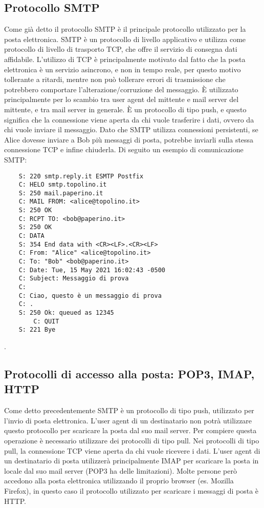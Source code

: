 \subsection{Protocollo SMTP}
Come già detto il protocollo SMTP è il principale protocollo utilizzato per la posta elettronica.
SMTP è un protocollo di livello applicativo e utilizza come protocollo di livello di trasporto TCP,
che offre il servizio di consegna dati affidabile. 
L'utilizzo di TCP è principalmente motivato dal fatto che la posta elettronica è un servizio asincrono, 
e non in tempo reale, per questo motivo tollerante a ritardi, mentre non può tollerare errori di trasmissione 
che potrebbero comportare l'alterazione/corruzione del messaggio. 
È utilizzato principalmente per lo scambio tra user agent del mittente e mail server del mittente, e tra mail server 
in generale. È un protocollo di tipo push, e questo significa che la connessione viene aperta da chi vuole 
trasferire i dati, ovvero da chi vuole inviare il messaggio. Dato che SMTP utilizza connessioni persistenti, 
se Alice dovesse inviare a Bob più messaggi di posta, potrebbe inviarli sulla stessa connessione TCP e 
infine chiuderla.
Di seguito un esempio di comunicazione SMTP:
\pagebreak
\begin{verbatim}
    S: 220 smtp.reply.it ESMTP Postfix
    C: HELO smtp.topolino.it
    S: 250 mail.paperino.it
    C: MAIL FROM: <alice@topolino.it>
    S: 250 OK
    C: RCPT TO: <bob@paperino.it>
    S: 250 OK
    C: DATA
    S: 354 End data with <CR><LF>.<CR><LF>
    C: From: "Alice" <alice@topolino.it>
    C: To: "Bob" <bob@paperino.it>
    C: Date: Tue, 15 May 2021 16:02:43 -0500
    C: Subject: Messaggio di prova
    C: 
    C: Ciao, questo è un messaggio di prova
    C: .
    S: 250 Ok: queued as 12345
        C: QUIT
    S: 221 Bye
\end{verbatim}\cite{SMTP}.

\subsection{Protocolli di accesso alla posta: POP3, IMAP, HTTP}
Come detto precedentemente SMTP è un protocollo di tipo push, 
utilizzato per l’invio di posta elettronica. L’user agent di un destinatario non potrà utilizzare questo 
protocollo per scaricare la posta dal suo mail server. 
Per compiere questa operazione è necessario utilizzare dei protocolli di tipo pull. 
Nei protocolli di tipo pull, la connessione TCP viene aperta da chi vuole ricevere i dati. 
L’user agent di un destinatario di posta utilizzerà principalmente IMAP per scaricare la posta in locale 
dal suo mail server (POP3 ha delle limitazioni). 
Molte persone però accedono alla posta elettronica utilizzando il proprio browser (es. Mozilla Firefox), 
in questo caso il protocollo utilizzato per scaricare i messaggi di posta è HTTP.

